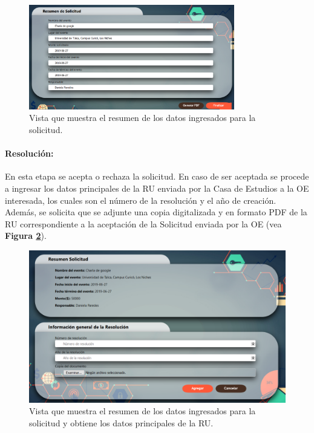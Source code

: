     \begin{figure}[h]
        \centering
        \includegraphics[width= 0.8\textwidth]{Imagenes/Resumen.PNG}
        \caption{\label{fig: ResumenSolicitud}Vista que muestra el resumen de los datos ingresados para la solicitud.}
    \end{figure}

\paragraph{Resolución: } En esta etapa se acepta o rechaza la solicitud. En caso de ser aceptada se procede a ingresar los datos principales de la RU enviada por la Casa de Estudios a la OE interesada, los cuales son el número de la resolución y el año de creación. Además, se solicita que se adjunte una copia digitalizada y en formato PDF de la RU correspondiente a la aceptación de la Solicitud enviada por la OE (vea \textbf{Figura \ref{fig: Resolucion}}).

\begin{figure}[h]
    \centering
    \includegraphics[width= \textwidth]{Imagenes/Resolucion.PNG}
    \caption{\label{fig: Resolucion}Vista que muestra el resumen de los datos ingresados para la solicitud y obtiene los datos principales de la RU.}
\end{figure}

